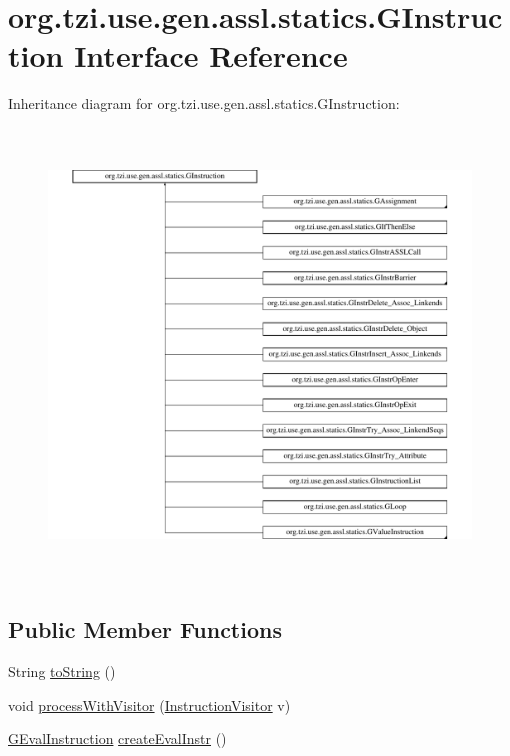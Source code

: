 \hypertarget{interfaceorg_1_1tzi_1_1use_1_1gen_1_1assl_1_1statics_1_1_g_instruction}{\section{org.\-tzi.\-use.\-gen.\-assl.\-statics.\-G\-Instruction Interface Reference}
\label{interfaceorg_1_1tzi_1_1use_1_1gen_1_1assl_1_1statics_1_1_g_instruction}
}
Inheritance diagram for org.\-tzi.\-use.\-gen.\-assl.\-statics.\-G\-Instruction\-:\begin{figure}[H]
\begin{center}
\leavevmode
\includegraphics[height=12.000000cm]{interfaceorg_1_1tzi_1_1use_1_1gen_1_1assl_1_1statics_1_1_g_instruction}
\end{center}
\end{figure}
\subsection*{Public Member Functions}
\begin{DoxyCompactItemize}
\item 
String \hyperlink{interfaceorg_1_1tzi_1_1use_1_1gen_1_1assl_1_1statics_1_1_g_instruction_a2ce478cb4d7c839fec6db330099638a9}{to\-String} ()
\item 
void \hyperlink{interfaceorg_1_1tzi_1_1use_1_1gen_1_1assl_1_1statics_1_1_g_instruction_a2612dfe9a7517d1212cea19914265c6c}{process\-With\-Visitor} (\hyperlink{interfaceorg_1_1tzi_1_1use_1_1gen_1_1assl_1_1statics_1_1_instruction_visitor}{Instruction\-Visitor} v)
\item 
\hyperlink{classorg_1_1tzi_1_1use_1_1gen_1_1assl_1_1dynamics_1_1_g_eval_instruction}{G\-Eval\-Instruction} \hyperlink{interfaceorg_1_1tzi_1_1use_1_1gen_1_1assl_1_1statics_1_1_g_instruction_ad87637b0c3446ea4c81161f243181311}{create\-Eval\-Instr} ()
\end{DoxyCompactItemize}



